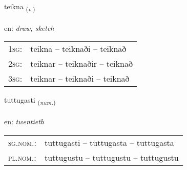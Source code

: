 \documentclass[frontgrid, backgrid]{flacards}\usepackage[]{graphicx}\usepackage[]{xcolor}
\begin{document}
\renewcommand{\flhead}{\vskip5pt \fboxsep=0pt {\small\bfseries\footnotesize Sagnorð | Verb}}
\renewcommand{\fcfoot}{\vskip5pt \fboxsep=0pt \hspace{2pt}{\small\bfseries\footnotesize 3K}}

\renewcommand{\blhead}{\vskip5pt {\small\bfseries\footnotesize Sagnorð | Verb }}
\renewcommand{\bcfoot}{\vskip5pt \hspace{2pt}{\small\bfseries\footnotesize 3K}}


{teikna \small{\textsubscript{(\textit{v.})}} \\[1ex] %
\textphonetic{[tʰeihkna]} \\
en: \emph{draw, sketch} \\  [2ex]
\renewcommand*{\arraystretch}{0.8}
\begin{tabular}{p{1cm}l}
\textsc{1sg}: & teikna -- teiknaði -- teiknað \\ 
\textsc{2sg}: & teiknar -- teiknaðir -- teiknað \\ 
\textsc{3sg}: & teiknar -- teiknaði -- teiknað \\ 
\end{tabular}
}

\renewcommand{\flhead}{\vskip5pt \fboxsep=0pt {\small\bfseries\footnotesize Töluorð | Numeral}}
\renewcommand{\fcfoot}{\vskip5pt \fboxsep=0pt \hspace{2pt}{\small\bfseries\footnotesize 3K}}

\renewcommand{\blhead}{\vskip5pt {\small\bfseries\footnotesize Töluorð | Numeral }}
\renewcommand{\bcfoot}{\vskip5pt \hspace{2pt}{\small\bfseries\footnotesize 3K}}


{tuttugasti \small{\textsubscript{(\textit{num.})}} \\[1ex] %
\textphonetic{[tʰʏhtʏɣastɪ]} \\
en: \emph{twentieth} \\  [2ex]
\renewcommand*{\arraystretch}{0.8}
\begin{tabular}{ll}
\textsc{sg.nom.}: & tuttugasti  --  tuttugasta -- tuttugasta \\ 
\textsc{pl.nom.}: & tuttugustu -- tuttugustu -- tuttugustu
\end{tabular}
}
\end{document}
